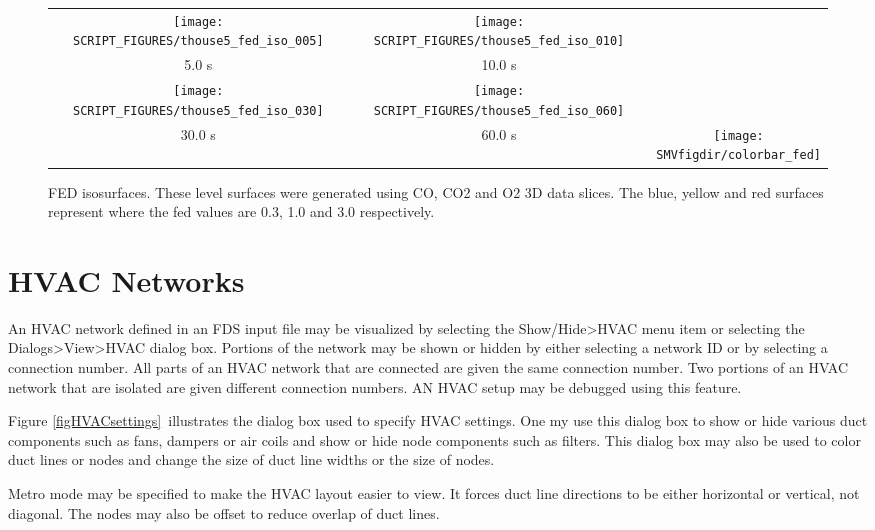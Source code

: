 \documentclass[11pt,twoside]{book}
\newcommand{\figheightAbar}{2.2in}
\begin{document}
\begin{figure}[bph]
\begin{center}
\begin{tabular}{ccc}
\texttt{[image: SCRIPT\_FIGURES/thouse5\_fed\_iso\_005]}&
\texttt{[image: SCRIPT\_FIGURES/thouse5\_fed\_iso\_010]}\\
5.0 s&10.0 s\\
\texttt{[image: SCRIPT\_FIGURES/thouse5\_fed\_iso\_030]}&
\texttt{[image: SCRIPT\_FIGURES/thouse5\_fed\_iso\_060]}&\\
30.0 s&60.0 s
&\raisebox{0.0ex}[0pt]{\texttt{[image: \\SMVfigdir/colorbar\_fed]}}\\
\end{tabular}
\caption [FED slices.]
{FED isosurfaces.
These level surfaces were generated using CO, CO2 and O2 3D data slices.
The blue, yellow and red surfaces represent where the
fed values are 0.3, 1.0 and 3.0 respectively.
}
\label{figfediso}%
\end{center}
\end{figure}

\section{HVAC Networks}

An HVAC network defined in an FDS input file may be visualized  by
selecting the Show/Hide>HVAC menu item or selecting the Dialogs>View>HVAC dialog box.
Portions of the network may be shown or hidden by either selecting a network ID or
by selecting a connection number.  All parts of an HVAC network that are connected
are given the same connection number.  Two portions of an HVAC network
that are isolated are given different connection numbers.  AN HVAC setup may
be debugged using this feature.

Figure \ref{figHVACsettings}\ illustrates the dialog box used to specify HVAC settings.
One my use this dialog box to show or hide various duct components such as fans, dampers
or air coils and show or hide node
components such as filters. This dialog box may also be used to color duct lines or nodes and change the
size of duct line widths or the size of nodes.

Metro mode may be specified to make the HVAC layout easier to view.  It forces duct line directions to be either horizontal or vertical, not diagonal. The nodes may also be
offset to reduce overlap of duct lines.
\end{document}
